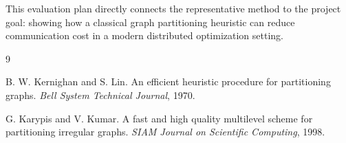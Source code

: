 \documentclass[11pt]{article}
\begin{document}
This evaluation plan directly connects the representative method to the
project goal: showing how a classical graph partitioning heuristic can reduce
communication cost in a modern distributed optimization setting.

\begin{thebibliography}{9}

B. W. Kernighan and S. Lin.
\newblock An efficient heuristic procedure for partitioning graphs.
\newblock \emph{Bell System Technical Journal}, 1970.

G. Karypis and V. Kumar.
\newblock A fast and high quality multilevel scheme for partitioning irregular graphs.
\newblock \emph{SIAM Journal on Scientific Computing}, 1998.

\end{thebibliography}
\end{document}
